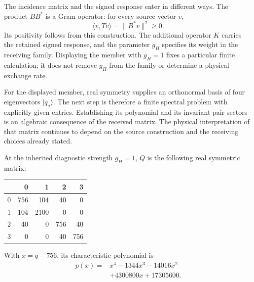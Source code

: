 \documentclass[10pt,twocolumn,letterpaper]{article}
\begin{document}
The incidence matrix and the signed response enter in different ways. The product $BB^*$ is a Gram operator: for every source vector $v$,
\[
\langle v,Tv\rangle=\|B^*v\|^2\geq 0.
\]
Its positivity follows from this construction. The additional operator $K$ carries the retained signed response, and the parameter $g_H$ specifies its weight in the receiving family. Displaying the member with $g_H=1$ fixes a particular finite calculation; it does not remove $g_H$ from the family or determine a physical exchange rate.

For the displayed member, real symmetry supplies an orthonormal basis of four eigenvectors $|q_a\rangle$. The next step is therefore a finite spectral problem with explicitly given entries. Establishing its polynomial and its invariant pair sectors is an algebraic consequence of the received matrix. The physical interpretation of that matrix continues to depend on the source construction and the receiving choices already stated.



At the inherited diagnostic strength $g_H=1$, $Q$ is the following real symmetric matrix:
\begin{center}
\small
\begin{tabular*}{\columnwidth}{@{\extracolsep{\fill}}lrrrr@{}}
\toprule
 & \textbf{0} & \textbf{1} & \textbf{2} & \textbf{3}\\
\midrule
0 & 756 & 104 & 40 & 0\\
1 & 104 & 2100 & 0 & 0\\
2 & 40 & 0 & 756 & 40\\
3 & 0 & 0 & 40 & 756\\
\bottomrule
\end{tabular*}
\end{center}
With $x=q-756$, its characteristic polynomial is
\begin{equation}
\begin{aligned}
p(x)={}&x^4-1344x^3-14016x^2\\
&+4300800x+17305600.
\end{aligned}
\tag{4}
\end{equation}
\end{document}
